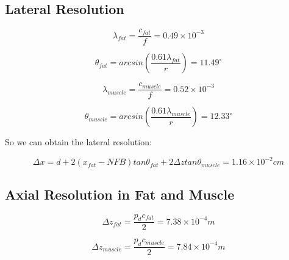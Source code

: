 \documentclass[11pt,a4paper,BCOR12mm, headexclude, footexclude, twoside, openright]{scrartcl}
\numberwithin{equation}{section} %
\numberwithin{figure}{section} %
\numberwithin{table}{section} %
\begin{document}
\subsection{Lateral Resolution} 

\begin{equation}
    \lambda_{fat}=\frac{c_{fat}}{f}=0.49\times10^{-3}
\end{equation}

\begin{equation}
    \theta_{fat}= arcsin(\frac{0.61\lambda_{fat}}{r}) = 11.49^\circ
\end{equation}

\begin{equation}
    \lambda_{muscle}=\frac{c_{muscle}}{f}=0.52\times10^{-3}
\end{equation}

\begin{equation}
    \theta_{muscle}= arcsin(\frac{0.61\lambda_{muscle}}{r}) = 12.33^\circ
\end{equation}

So we can obtain the lateral resolution:

\begin{equation}
    \Delta x = d + 2(x_{fat}-NFB)tan\theta_{fat}+ 2\Delta z tan\theta_{muscle}= 1.16\times10^{-2}cm
\end{equation}

\subsection{Axial Resolution in Fat and Muscle} 

\begin{equation}
    \Delta z_{fat} = \frac{p_dc_{fat}}{2} = 7.38\times10^{-4}m
\end{equation}

\begin{equation}
     \Delta z_{muscle} = \frac{p_dc_{muscle}}{2} = 7.84\times10^{-4}m
\end{equation}
\end{document}
